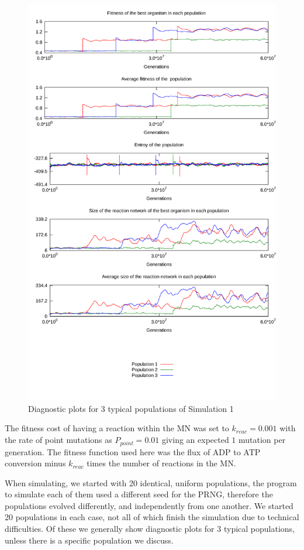 \documentclass[10pt,a4paper]{article}
\begin{document}
\begin{figure}[htpb]
	\centering
	\includegraphics[width=1\linewidth]{simulation1.pdf}
	\caption{Diagnostic plots for 3 typical populations of Simulation 1}
	\label{fig:simulation1}
\end{figure}

The fitness cost of having a reaction within the MN was set to $k_{reac}=0.001$ with the rate of point mutations as $P_{point}=0.01$ giving an expected $1$ mutation per generation. The fitness function used here was the flux of ADP to ATP conversion minus $k_{reac}$ times the number of reactions in the MN.

When simulating, we started with 20 identical, uniform populations, the program to simulate each of them used a different seed for the PRNG, therefore the populations evolved differently, and independently from one another. We started 20 populations in each case, not all of which finish the simulation due to technical difficulties. Of these we generally show diagnostic plots for 3 typical populations, unless there is a specific population we discuss. 
\end{document}
